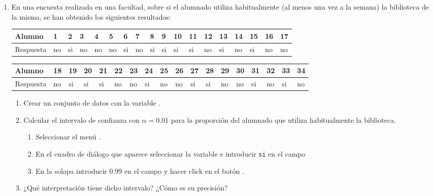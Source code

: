 \begin{enumerate}[leftmargin=*]
\item En una encuesta realizada en una facultad, sobre si el alumnado utiliza habitualmente (al menos una vez a la
semana) la biblioteca de la misma, se han obtenido los siguientes resultados:
\begin{flushleft}
\begin{tabular}{|l|l|l|l|l|l|l|l|l|l|l|l|l|l|l|l|l|l|}
\hline
Alumno & 1 & 2 & 3 & 4 & 5 & 6 & 7 & 8 & 9 & 10 & 11 & 12 & 13 & 14 & 15 & 16 & 17 \\
\hline
Respuesta & no & si & no & no & no & si & no & si & si & si & si & no & si & no & si & no & no \\
\hline
\end{tabular}
\newline

\begin{tabular}{|l|l|l|l|l|l|l|l|l|l|l|l|l|l|l|l|l|l|}
\hline
Alumno & 18 & 19 & 20 & 21 & 22 & 23 & 24 & 25 & 26 & 27 & 28 & 29 & 30 & 31 & 32 & 33 & 34 \\
\hline
Respuesta & no & si & si & si & no & no & si & no & no & si & si & no & no & si & no & si & no \\
\hline
\end{tabular}
\end{flushleft}

\begin{enumerate}
\item Crear un conjunto de datos con la variable .
\item Calcular el intervalo de confianza con $\alpha=0.01$ para la proporción del alumnado que utiliza habitualmente la biblioteca. 
\begin{indicacion}{
\begin{enumerate}
\item Seleccionar el menú .
\item En el cuadro de diálogo que aparece seleccionar la variable  e introducir \texttt{si} en el campo  
\item En la solapa  introducir $0.99$ en el campo  y hacer click en el botón .
\end{enumerate}
}
\end{indicacion}

\item ¿Qué interpretación tiene dicho intervalo? ¿Cómo es su precisión?


\end{enumerate}
\end{enumerate}

